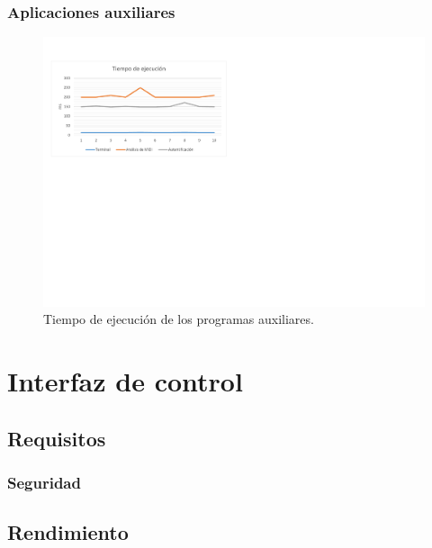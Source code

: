 \smallskip

\subsubsection{Aplicaciones auxiliares}

\smallskip

\begin{figure}[H]
	\noindent \begin{centering}
		\includegraphics[width=\linewidth*3/4]{capitulo6/ejecucion}
		\par\end{centering}
	\smallskip
	\caption{\label{fig:ejecucion} Tiempo de ejecución de los programas auxiliares.}
\end{figure} 

\smallskip

\section{Interfaz de control}

\subsection{Requisitos}

\subsubsection{Seguridad}

\subsection{Rendimiento}

